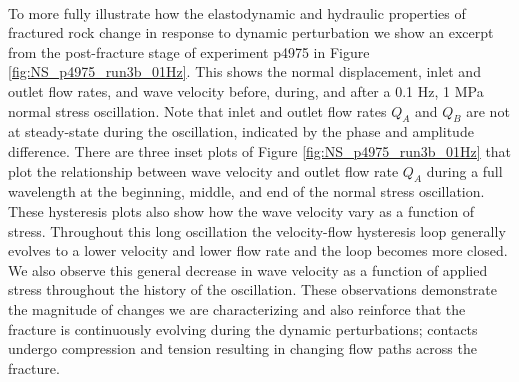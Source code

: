 \documentclass[letterpaper,10pt]{article}
\begin{document}
\paragraph{}
To more fully illustrate how the elastodynamic and hydraulic properties of fractured rock change in response to dynamic perturbation we show an excerpt from the post-fracture stage of experiment p4975 in Figure \ref{fig:NS_p4975_run3b_01Hz}. This shows the normal displacement, inlet and outlet flow rates, and wave velocity before, during, and after a 0.1 Hz, 1 MPa normal stress oscillation. Note that inlet and outlet flow rates $ Q_A $ and $ Q_B $ are not at steady-state during the oscillation, indicated by the phase and amplitude difference. There are three inset plots of Figure \ref{fig:NS_p4975_run3b_01Hz} that plot the relationship between wave velocity and outlet flow rate $ Q_A $ during a full wavelength at the beginning, middle, and end of the normal stress oscillation. These hysteresis plots also show how the wave velocity vary as a function of stress. Throughout this long oscillation the velocity-flow hysteresis loop generally evolves to a lower velocity and lower flow rate and the loop becomes more closed. We also observe this general decrease in wave velocity as a function of applied stress throughout the history of the oscillation. These observations demonstrate the magnitude of changes we are characterizing and also reinforce that the fracture is continuously evolving during the dynamic perturbations; contacts undergo compression and tension resulting in changing flow paths across the fracture. 
\end{document}
